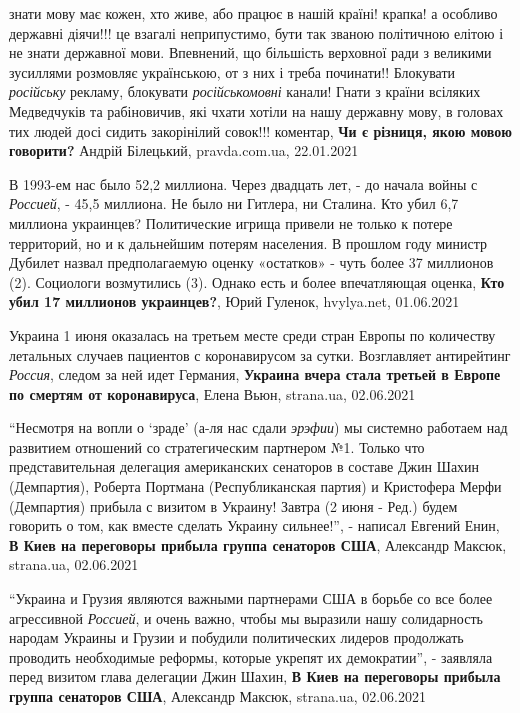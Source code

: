 знати мову має кожен, хто живе, або працює в нашій країні! крапка! а особливо
державні діячи!!! це взагалі неприпустимо, бути так званою політичною елітою і
не знати державної мови. Впевнений, що більшість верховної ради з великими
зусиллями розмовляє українською, от з них і треба починати!!  Блокувати
\emph{російську} рекламу, блокувати \emph{російськомовні} канали! Гнати з країни всіляких
Медведчуків та рабіновичив, які чхати хотіли на нашу державну мову, в головах
тих людей досі сидить закорінілий совок!!!
коментар, \textbf{Чи є різниця, якою мовою говорити?} Андрій Білецький, pravda.com.ua, 22.01.2021

В 1993-ем нас было 52,2 миллиона. Через двадцать лет, - до начала войны с
\emph{Россией}, - 45,5 миллиона. Не было ни Гитлера, ни Сталина. Кто убил 6,7 миллиона
украинцев?  Политические игрища привели не только к потере территорий, но и к
дальнейшим потерям населения. В прошлом году министр Дубилет назвал
предполагаемую оценку «остатков» - чуть более 37 миллионов (2). Социологи
возмутились (3). Однако есть и более впечатляющая оценка,
\textbf{Кто убил 17 миллионов украинцев?}, Юрий Гуленок, hvylya.net, 01.06.2021

Украина 1 июня оказалась на третьем месте среди стран Европы по количеству
летальных случаев пациентов с коронавирусом за сутки. Возглавляет антирейтинг
\emph{Россия}, следом за ней идет Германия, 
\textbf{Украина вчера стала третьей в Европе по смертям от коронавируса}, Елена Вьюн, strana.ua, 02.06.2021

\enquote{Несмотря на вопли о \enquote{зраде} (а-ля нас сдали \emph{эрэфии}) мы системно работаем над
развитием отношений со стратегическим партнером №1. Только что представительная
делегация американских сенаторов в составе Джин Шахин (Демпартия), Роберта
Портмана (Республиканская партия) и Кристофера Мерфи (Демпартия) прибыла с
визитом в Украину! Завтра (2 июня - Ред.) будем говорить о том, как вместе
сделать Украину сильнее!}, - написал Евгений Енин,
\textbf{В Киев на переговоры прибыла группа сенаторов США}, Александр Максюк, strana.ua, 02.06.2021

\enquote{Украина и Грузия являются важными партнерами США в борьбе со все более
агрессивной \emph{Россией}, и очень важно, чтобы мы выразили нашу солидарность народам
Украины и Грузии и побудили политических лидеров продолжать проводить
необходимые реформы, которые укрепят их демократии}, - заявляла перед визитом
глава делегации Джин Шахин,
\textbf{В Киев на переговоры прибыла группа сенаторов США}, Александр Максюк, strana.ua, 02.06.2021

